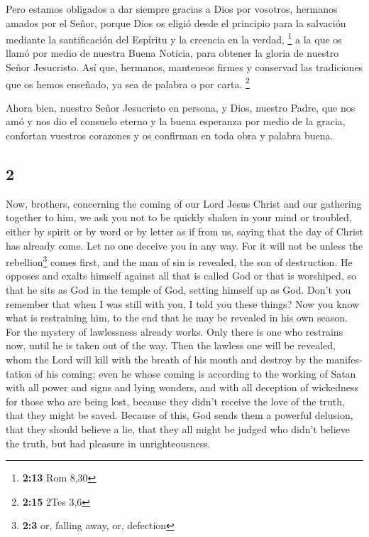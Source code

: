 \begin{paracol}{2}
 Pero estamos obligados a dar siempre gracias a Dios por
vosotros, hermanos amados por el Señor, porque Dios os eligió desde el
principio para la salvación mediante la santificación del Espíritu y la
creencia en la verdad, \footnote{\textbf{2:13} Rom 8,30} 
a la que os llamó por medio de nuestra Buena Noticia, para obtener la
gloria de nuestro Señor Jesucristo.  Así que, hermanos,
manteneos firmes y conservad las tradiciones que os hemos enseñado, ya
sea de palabra o por carta. \footnote{\textbf{2:15} 2Tes 3,6}

 Ahora bien, nuestro Señor Jesucristo en persona, y Dios,
nuestro Padre, que nos amó y nos dio el consuelo eterno y la buena
esperanza por medio de la gracia,  confortan vuestros
corazones y os confirman en toda obra y palabra buena.

\switchcolumn
\begin{otherlanguage}{english}

\hypertarget{section-3}{%
\section{2}\label{section-3}}

 Now, brothers, concerning the coming of our Lord Jesus
Christ and our gathering together to him, we ask you  not
to be quickly shaken in your mind or troubled, either by spirit or by
word or by letter as if from us, saying that the day of Christ has
already come.  Let no one deceive you in any way. For it
will not be unless the rebellion\footnote{\textbf{2:3} or, falling away,
  or, defection} comes first, and the man of sin is revealed, the son of
destruction.  He opposes and exalts himself against all
that is called God or that is worshiped, so that he sits as God in the
temple of God, setting himself up as God.  Don't you
remember that when I was still with you, I told you these things?
 Now you know what is restraining him, to the end that he
may be revealed in his own season.  For the mystery of
lawlessness already works. Only there is one who restrains now, until he
is taken out of the way.  Then the lawless one will be
revealed, whom the Lord will kill with the breath of his mouth and
destroy by the manifestation of his coming;  even he whose
coming is according to the working of Satan with all power and signs and
lying wonders,  and with all deception of wickedness for
those who are being lost, because they didn't receive the love of the
truth, that they might be saved.  Because of this, God
sends them a powerful delusion, that they should believe a lie,
 that they all might be judged who didn't believe the
truth, but had pleasure in unrighteousness.


\end{otherlanguage}
\end{paracol}
